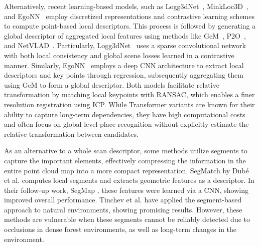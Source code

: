 Alternatively, recent learning-based models, such as Logg3dNet~\cite{vidanapathirana2022icra}, MinkLoc3D~\cite{komorowski2021wacv}, and EgoNN~\cite{komorowski2022ral} employ discretized representations and contrastive learning schemes to compute point-based local descriptors. This process is followed by generating a global descriptor of aggregated local features using methods like GeM~\cite{radenovic2019pami}, P2O~\cite{vidanapathirana2021icra}, and NetVLAD~\cite{arandjelovic2018pami}.  
Particularly, Logg3dNet~\cite{vidanapathirana2022icra} uses a sparse convolutional network with both local consistency and global scene losses learned in a contrastive manner. Similarly, EgoNN~\cite{komorowski2022ral} employs a deep CNN architecture to extract local descriptors and key points through regression, subsequently aggregating them using GeM to form a global descriptor.
Both models facilitate relative transformation by matching local keypoints with RANSAC, which enables a finer resolution registration using ICP. 
While Transformer variants \cite{zhang2019cvpr, xia2021cvpr, zhou2021icra, xu2021transloc3d} are known for their ability to capture long-term dependencies, they have high computational costs and  often focus on global-level place recognition without explicitly estimate the relative transformation between candidates. 

As an alternative to a whole scan descriptor, some methods utilize segments to capture the important elements, effectively compressing the information in the entire point cloud map into a more compact representation. SegMatch \cite{dube2017icra} by Dubé et al. computes local segments and extracts geometric features as a descriptor. In their follow-up work, SegMap \cite{dube2018rss}, these features were learned via a CNN, showing improved overall performance. Tinchev et al. \cite{tinchev2018iros, tinchev2019ral} have applied the segment-based approach to natural environments, showing promising results. However, these methods are vulnerable when these segments cannot be reliably detected due to occlusions in dense forest environments, as well as long-term changes in the environment.


